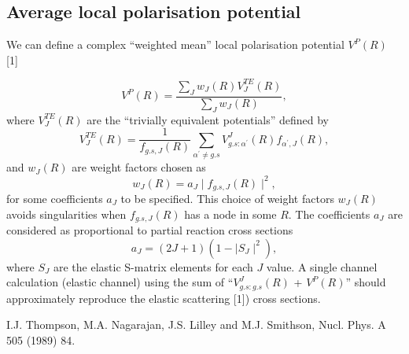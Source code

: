 \documentclass{article}
\begin{document}
\subsection*{Average local polarisation potential}

We can define a complex ``weighted mean'' local polarisation
potential $V^{P}(R)$  [1]

\begin{equation}
V^{P}(R)=\frac{\sum_{J}w_{J}(R)V_{J}^{TE}(R)}{\sum_{J}w_{J}(R)},  \label{Eq13}
\end{equation}
where $V_{J}^{TE}(R)$ are the ``trivially equivalent potentials'' defined by
\begin{equation}
V_{J}^{TE}(R)=\frac{1}{f_{g.s, J}(R)}\sum_{\alpha^{\prime}\neq g.s} V_{g.s:\alpha^{\prime}}^{J}(R)f_{\alpha^{\prime}, J}(R),  \label{Eq14}
\end{equation}
and $w_{J}(R)$ are weight factors chosen as
\begin{equation}
w_{J}(R)=a_{J}\mid f_{g.s, J}(R)\mid ^{2},  \label{Eq15}
\end{equation}
for some coefficients $a_{J}$ to be specified. This choice of weight factors
$w_{J}(R)$ avoids singularities when $f_{g.s, J}(R)$ has a node in
some $R$. The coefficients $a_{J}$ are considered as proportional to partial
reaction cross sections
\begin{equation}
a_{J}=(2J+1)(1-\mid S_{J}\mid ^{2}),  \label{Eq16}
\end{equation}
where $S_{J}$ are the elastic S-matrix elements for each $J$ value.
A single channel calculation (elastic
channel) using the sum of ``$V_{g.s:g.s}^{J}(R)$ + $V^{P}(R)$'' should
approximately reproduce the elastic scattering [1]) cross sections.

\bigskip
\noindent
[1] I.J. Thompson, M.A. Nagarajan, J.S. Lilley and M.J. Smithson,
Nucl. Phys. A 505 (1989) 84.
\end{document}
